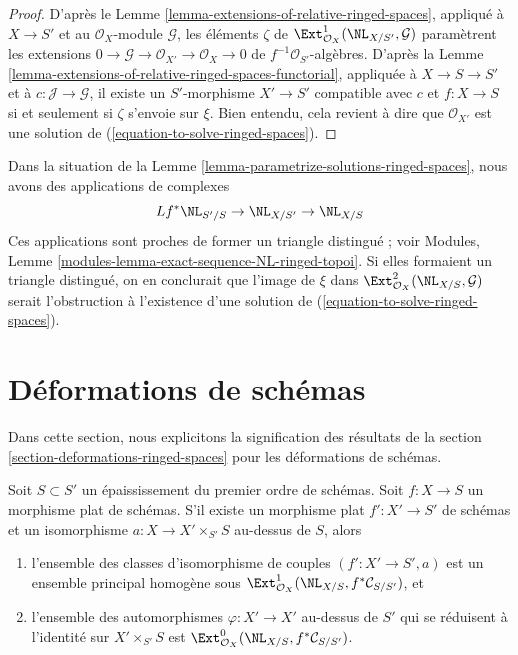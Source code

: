 \begin{proof}
D'après le Lemme \ref{lemma-extensions-of-relative-ringed-spaces}, appliqué
à $X \to S'$ et au $\mathcal{O}_X$-module $\mathcal{G}$, les éléments
$\zeta$ de
$\Ext^1_{\mathcal{O}_X}(\NL_{X/S'}, \mathcal{G})$
paramètrent les extensions
$0 \to \mathcal{G} \to \mathcal{O}_{X'} \to \mathcal{O}_X \to 0$
de $f^{-1}\mathcal{O}_{S'}$-algèbres.
D'après la
Lemme \ref{lemma-extensions-of-relative-ringed-spaces-functorial}, appliquée
à $X \to S \to S'$ et à $c : \mathcal{J} \to \mathcal{G}$, il existe un
$S'$-morphisme $X' \to S'$ compatible avec $c$ et
$f : X \to S$ si et seulement si $\zeta$ s'envoie sur $\xi$.
Bien entendu, cela revient à dire que $\mathcal{O}_{X'}$ est une solution de
(\ref{equation-to-solve-ringed-spaces}).
\end{proof}

\begin{remark}
\label{remark-parametrize-solutions-ringed-spaces}
Dans la situation de la
Lemme \ref{lemma-parametrize-solutions-ringed-spaces}, nous avons des
applications de complexes
$$
Lf^*\NL_{S'/S} \to \NL_{X/S'} \to \NL_{X/S}
$$
Ces applications sont proches de former un triangle distingué ; voir
Modules, Lemme \ref{modules-lemma-exact-sequence-NL-ringed-topoi}.
Si elles formaient un triangle distingué, on en conclurait que l'image de
$\xi$ dans $\Ext^2_{\mathcal{O}_X}(\NL_{X/S}, \mathcal{G})$
serait l'obstruction à l'existence d'une solution de
(\ref{equation-to-solve-ringed-spaces}).
\end{remark}

\section{Déformations de schémas}
\label{section-deformations-schemes}

\noindent
Dans cette section, nous explicitons la signification des résultats de la
section \ref{section-deformations-ringed-spaces} pour les déformations de
schémas.

\begin{lemma}
\label{lemma-deform}
Soit $S \subset S'$ un épaississement du premier ordre de schémas.
Soit $f : X \to S$ un morphisme plat de schémas.
S'il existe un morphisme plat $f' : X' \to S'$ de schémas et un isomorphisme
$a : X \to X' \times_{S'} S$ au-dessus de $S$, alors
\begin{enumerate}
\item l'ensemble des classes d'isomorphisme de couples
$(f' : X' \to S', a)$ est un ensemble principal homogène sous
$\Ext^1_{\mathcal{O}_X}(\NL_{X/S}, f^*\mathcal{C}_{S/S'})$, et
\item l'ensemble des automorphismes $\varphi : X' \to X'$ au-dessus de $S'$
qui se réduisent à l'identité sur $X' \times_{S'} S$ est
$\Ext^0_{\mathcal{O}_X}(\NL_{X/S}, f^*\mathcal{C}_{S/S'})$.
\end{enumerate}
\end{lemma}

